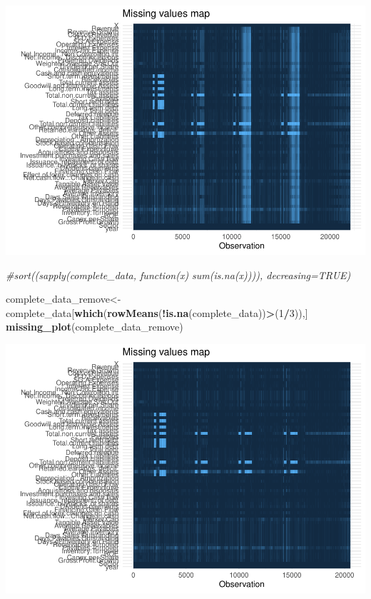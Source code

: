 \documentclass[11pt,]{article}
\newenvironment{Shaded}{\begin{snugshade}}{\end{snugshade}}
\newcommand{\CommentTok}[1]{\textcolor[rgb]{0.56,0.35,0.01}{\textit{#1}}}
\newcommand{\DecValTok}[1]{\textcolor[rgb]{0.00,0.00,0.81}{#1}}
\newcommand{\KeywordTok}[1]{\textcolor[rgb]{0.13,0.29,0.53}{\textbf{#1}}}
\newcommand{\NormalTok}[1]{#1}
\newcommand{\OperatorTok}[1]{\textcolor[rgb]{0.81,0.36,0.00}{\textbf{#1}}}
\begin{document}
\includegraphics{stock_analysis_files/figure-latex/unnamed-chunk-2-1.pdf}

\begin{Shaded}
\begin{Highlighting}[]
\CommentTok{#sort((sapply(complete_data, function(x) sum(is.na(x)))), decreasing=TRUE)}

\NormalTok{complete_data_remove<-complete_data[}\KeywordTok{which}\NormalTok{(}\KeywordTok{rowMeans}\NormalTok{(}\OperatorTok{!}\KeywordTok{is.na}\NormalTok{(complete_data))}\OperatorTok{>}\NormalTok{(}\DecValTok{1}\OperatorTok{/}\DecValTok{3}\NormalTok{)),]}
\KeywordTok{missing_plot}\NormalTok{(complete_data_remove)}
\end{Highlighting}
\end{Shaded}

\includegraphics{stock_analysis_files/figure-latex/unnamed-chunk-2-2.pdf}
\end{document}
